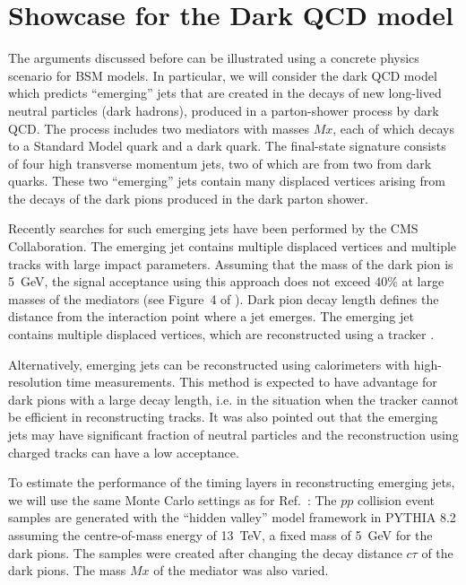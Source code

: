 \section{Showcase for the Dark QCD model}
\label{darksec}

The arguments discussed before can be illustrated using a concrete physics scenario for BSM models.
In particular, we will consider the dark QCD model \cite{Bai:2013xga,Schwaller:2015gea} which predicts 
``emerging'' jets 
that are created in the decays of new long-lived neutral 
particles (dark hadrons), produced in a parton-shower process by dark QCD.
The process includes  two mediators with masses $Mx$, each of which 
decays to a Standard Model quark and a dark quark. 
The final-state signature consists of four high transverse momentum jets, two of which 
are from two from dark quarks. These two ``emerging'' jets contain many displaced
vertices arising from the decays of the dark pions produced in the dark parton shower.


Recently searches for such emerging jets have been performed \cite{Sirunyan:2018njd} 
by the CMS Collaboration.
The emerging jet contains multiple displaced vertices and multiple 
tracks with large impact parameters. Assuming that the mass of the dark pion is 5~GeV, 
the signal acceptance using this approach does not exceed 40\% at large masses of the mediators
(see Figure~4 of \cite{Sirunyan:2018njd}).
Dark pion decay length defines the distance from the interaction point where a jet emerges. The  emerging jet contains multiple displaced vertices,
which are reconstructed using a tracker  \cite{Sirunyan:2018njd}.

Alternatively, emerging jets can be reconstructed using calorimeters with high-resolution time measurements. This method is expected
to have advantage for dark pions with a large decay length, i.e. in the situation when  the tracker cannot be efficient in reconstructing tracks.
It was also pointed out \cite{Schwaller:2015gea} that the emerging jets may have significant fraction of neutral particles and the reconstruction
using charged tracks can have a low acceptance.

To estimate the performance of the timing layers in reconstructing emerging jets,
we will use the same Monte Carlo settings as for Ref.~\cite{Sirunyan:2018njd}:
The $pp$ collision event samples  are generated with the ``hidden valley'' model framework in PYTHIA 8.2 assuming the centre-of-mass energy of 13~TeV, 
a fixed mass of 5~GeV for the dark pions. The samples were created after changing the decay distance $c\tau$ of the dark pions.  
The  mass $Mx$ of the mediator was also varied. 

